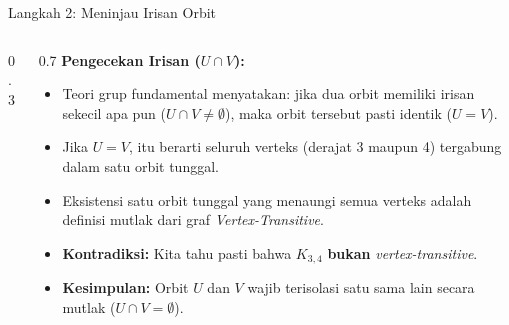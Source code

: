\documentclass[aspectratio=169]{beamer}
\begin{document}
\begin{frame}[fragile]{Langkah 2: Meninjau Irisan Orbit}
  \begin{columns}
    \begin{column}{0.3\textwidth}
    \end{column}

    \begin{column}{0.7\textwidth}
      \small
      \textbf{Pengecekan Irisan ($U \cap V$):}
      \begin{itemize}
        \item Teori grup fundamental menyatakan: jika dua orbit memiliki irisan sekecil apa pun ($U \cap V \neq \emptyset$), maka orbit tersebut pasti identik ($U = V$).
        \item Jika $U = V$, itu berarti seluruh verteks (derajat 3 maupun 4) tergabung dalam satu orbit tunggal.
        \item Eksistensi satu orbit tunggal yang menaungi semua verteks adalah definisi mutlak dari graf \textit{Vertex-Transitive}.
        \item \textbf{Kontradiksi:} Kita tahu pasti bahwa $K_{3,4}$ \textbf{bukan} \textit{vertex-transitive}.
        \item \textbf{Kesimpulan:} Orbit $U$ dan $V$ wajib terisolasi satu sama lain secara mutlak ($U \cap V = \emptyset$).
      \end{itemize}
    \end{column}
  \end{columns}
\end{frame}
\end{document}
